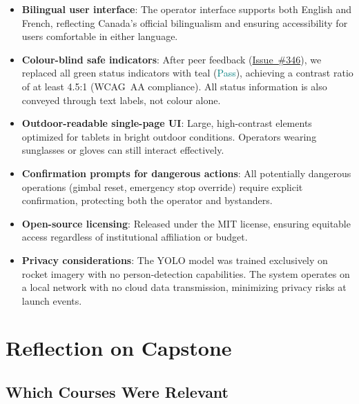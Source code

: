 \documentclass{article}
\newcommand{\ghIssue}[1]{\href{https://github.com/ZifanSi/vision-guided-tracker/issues/#1}{Issue~\##1}}
\begin{document}
\begin{itemize}
  \item \textbf{Bilingual user interface}: The operator interface supports both
        English and French, reflecting Canada's official bilingualism and ensuring
        accessibility for users comfortable in either language.

  \item \textbf{Colour-blind safe indicators}: After peer feedback
        (\ghIssue{346}), we replaced all green status indicators with teal
        (\textcolor{teal}{Pass}), achieving a contrast ratio of at least 4.5:1
        (WCAG~AA compliance). All status information is also conveyed through text
        labels, not colour alone.

  \item \textbf{Outdoor-readable single-page UI}: Large, high-contrast
        elements optimized for tablets in bright outdoor conditions. Operators
        wearing sunglasses or gloves can still interact effectively.

  \item \textbf{Confirmation prompts for dangerous actions}: All potentially
        dangerous operations (gimbal reset, emergency stop override) require
        explicit confirmation, protecting both the operator and bystanders.

  \item \textbf{Open-source licensing}: Released under the MIT license,
        ensuring equitable access regardless of institutional affiliation or budget.

  \item \textbf{Privacy considerations}: The YOLO model was trained exclusively
        on rocket imagery with no person-detection capabilities. The system operates
        on a local network with no cloud data transmission, minimizing privacy risks
        at launch events.
\end{itemize}

\section{Reflection on Capstone}

\subsection{Which Courses Were Relevant}
\end{document}
